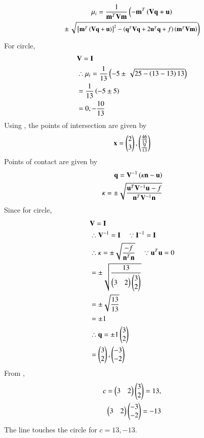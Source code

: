 \begin{multline}
\mu_i = \frac{1}
{
\mathbf{m}^T\mathbf{V}\mathbf{m}
}
\left(-\mathbf{m}^T\left(\mathbf{V}\mathbf{q}+\mathbf{u}\right)\right.
\\
\pm
{\small
\ensuremath{\left.\sqrt{
{}\left[
\mathbf{m}^T\left(\mathbf{V}\mathbf{q}+\mathbf{u}\right)
\right]^2
-
\left(
\mathbf{q}^T\mathbf{V}\mathbf{q} + 2\mathbf{u}^T\mathbf{q} +f
\right)
\left(\mathbf{m}^T\mathbf{V}\mathbf{m}\right)
}
\right)}
}
\end{multline}
For circle,
\begin{align}
    &\mathbf V = \mathbf I\\ 
    & \therefore \mu_i = \frac{1}{13}\left(-5 \pm \left.\sqrt{25- \left(13-13\right)13}
    \right)
    \right.\\
    & = \frac{1}{13}\left(-5 \pm 5\right)\\
    & = 0, -\frac{10}{13}
\end{align}
Using \brak{\ref{eq:solutions/4/2/2/points of intersection}}, the points of intersection are given by
\begin{align}
    \mathbf x = \begin{pmatrix}2\\3\end{pmatrix} , \begin{pmatrix}\frac{46}{13}\\ \frac{9}{13}\end{pmatrix}
\end{align}
Points of contact are given by
\begin{align}
    \mathbf q = \mathbf V^{-1} \left(\kappa \mathbf n - \mathbf u\right)\\
    \kappa = \pm \sqrt{\frac{\mathbf u^T \mathbf V^{-1} \mathbf u -f}{\mathbf n^T \mathbf V^{-1} \mathbf n}}
\end{align}
Since for circle,
\begin{align}
    &\mathbf V= \mathbf I\\
    &\therefore \mathbf V^{-1} = \mathbf I \quad \because \mathbf I^{-1}
    = \mathbf I\\
    &\therefore \kappa =\pm  \sqrt{\frac{-f}{\mathbf n^T \mathbf n}}\quad\because \mathbf u^T\mathbf u= 0\\
    & = \pm \sqrt{\frac{13}{\begin{pmatrix}3 & 2\end{pmatrix}\begin{pmatrix}3\\2\end{pmatrix}}}\\
    & = \pm \sqrt{\frac{13}{13}}\\
    & = \pm 1\\
    &\therefore \mathbf q = \pm 1\begin{pmatrix}3\\2\end{pmatrix}\\
    & = \begin{pmatrix}3\\2\end{pmatrix}, \begin{pmatrix}-3\\-2\end{pmatrix}
\end{align}
From \brak{\ref{eq:solutions/4/2/2/tangent}},
\begin{align}
    c = \begin{pmatrix}3 & 2\end{pmatrix}\begin{pmatrix}3\\2\end{pmatrix} = 13, \\ \begin{pmatrix}3&2\end{pmatrix}\begin{pmatrix}-3\\-2\end{pmatrix}=-13
\end{align}
The line \brak{\ref{eq:solutions/4/2/2/tangent}} touches the circle for $c = 13, -13$.

